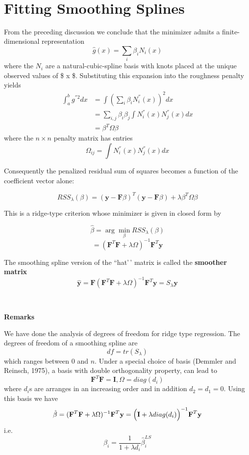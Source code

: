 \documentclass[
]{book}
\begin{document}
~
~

\section{Fitting Smoothing Splines}\label{fitting-smoothing-splines}

From the preceding discussion we conclude that the minimizer admits a finite-dimensional representation
\[\hat{g}(x) = \sum_i \beta_i N_i(x)\]
where the \(N_i\) are a natural-cubic-spline basis with knots placed at the unique observed values of \$ x \$. Substituting this expansion into the roughness penalty yields
\begin{align*}
\int_{a}^{b} g^{''2} dx &= \int  \left( \sum_i \beta_i N_i^{''}(x)\right)^2 dx\\
&= \sum_{i,j} \beta_i \beta_j \int N_i^{''}(x) N_j^{''}(x) dx\\
&=\beta^T \Omega \beta
\end{align*}
where the \(n\times n\) penalty matrix has entries
\[\Omega_{ij} = \int N^{''}_{i}(x) N^{''}_{j}(x) dx\]

Consequently the penalized residual sum of squares becomes a function of the coefficient vector alone:

\[RSS_{\lambda}(\beta) = (\mathbf{y} - \mathbf{F}\beta)^T(\mathbf{y} - \mathbf{F}\beta) + \lambda  \beta^T \Omega \beta \]

This is a ridge-type criterion whose minimizer is given in closed form by

\[\hat{\beta} = \arg \min_{\beta} RSS_{\lambda}(\beta)\]
\[=(\mathbf{F}^T \mathbf{F} +\lambda \Omega)^{-1} \mathbf{F}^T \mathbf{y}\]

The smoothing spline version of the ``hat'\,' matrix is called the \textbf{smoother matrix}
\[\mathbf{\hat{y}} = \mathbf{F} (\mathbf{F}^T \mathbf{F} +\lambda \Omega)^{-1} \mathbf{F}^T \mathbf{y} = S_{\lambda} \mathbf{y}\]

~

\textbf{Remarks}

We have done the analysis of degrees of freedom for ridge type regression. The degrees of freedom of a smoothing spline are
\[df = tr(S_{\lambda})\]
which ranges between \(0\) and \(n\). Under a special choice of basis (Demmler and Reinsch,
1975), a basis with double orthogonality property, can lead to
\[\mathbf{F}^T \mathbf{F} = \mathbf{I}, \Omega = diag(d_i)\]
where \(d_i\)s are arranges in an increasing order and in addition \(d_2=d_1=0\). Using this basis we have
\[\hat{\beta} = (\mathbf{F}^T \mathbf{F} +\lambda \Omega)^{-1} \mathbf{F}^T \mathbf{y} = \Bigl(\mathbf{I} + \lambda diag(d_i) \Bigr)^{-1} \mathbf{F}^T \mathbf{y}\]
i.e.
\[\hat{\beta}_i = \frac{1}{1+\lambda d_i} \hat{\beta}_i^{LS}\]
\end{document}
